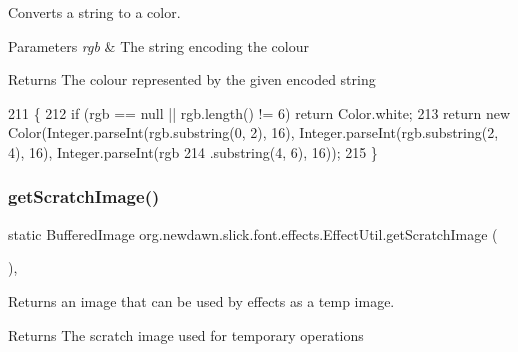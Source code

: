 Converts a string to a color.


\begin{DoxyParams}{Parameters}
{\em rgb} & The string encoding the colour \\
\hline
\end{DoxyParams}
\begin{DoxyReturn}{Returns}
The colour represented by the given encoded string 
\end{DoxyReturn}

\begin{DoxyCode}
211                                                 \{
212         \textcolor{keywordflow}{if} (rgb == null || rgb.length() != 6) \textcolor{keywordflow}{return} Color.white;
213         \textcolor{keywordflow}{return} \textcolor{keyword}{new} Color(Integer.parseInt(rgb.substring(0, 2), 16), Integer.parseInt(rgb.substring(2, 4), 
      16), Integer.parseInt(rgb
214             .substring(4, 6), 16));
215     \}
\end{DoxyCode}
\mbox{\label{classorg_1_1newdawn_1_1slick_1_1font_1_1effects_1_1_effect_util_a0a6af9e796e02dc40cfdf20d2fce6675}} 
\subsubsection{\texorpdfstring{get\+Scratch\+Image()}{getScratchImage()}}
{\footnotesize\ttfamily static Buffered\+Image org.\+newdawn.\+slick.\+font.\+effects.\+Effect\+Util.\+get\+Scratch\+Image (\begin{DoxyParamCaption}{ }\end{DoxyParamCaption})\hspace{0.3cm}{\ttfamily [inline]}, {\ttfamily [static]}}

Returns an image that can be used by effects as a temp image.

\begin{DoxyReturn}{Returns}
The scratch image used for temporary operations 
\end{DoxyReturn}

